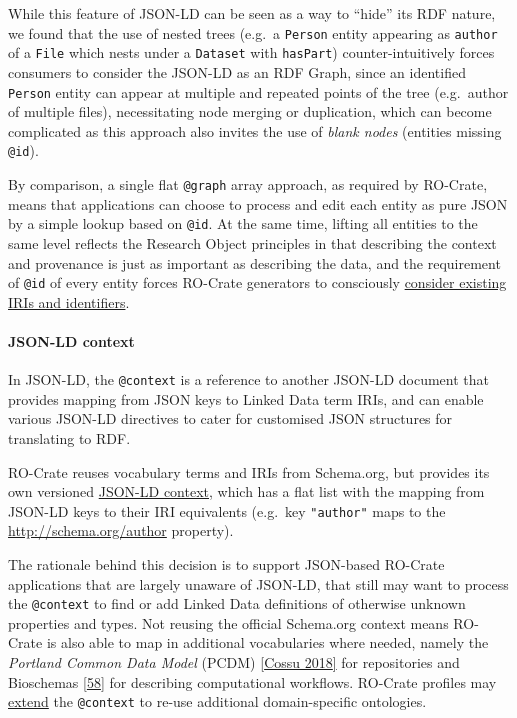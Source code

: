 {While this feature of JSON-LD can be seen as a way to ``hide'' its RDF
nature, we found that the use of nested trees (e.g.~a \texttt{Person}
entity appearing as \texttt{author} of a \texttt{File} which nests under
a \texttt{Dataset} with \texttt{hasPart}) counter-intuitively forces
consumers to consider the JSON-LD as an RDF Graph, since an identified
\texttt{Person} entity can appear at multiple and repeated points of the
tree (e.g.~author of multiple files), necessitating node merging or
duplication, which can become complicated as this approach also invites
the use of \emph{blank nodes} (entities missing \texttt{@id}).

By comparison, a single flat \texttt{@graph} array approach, as required
by RO-Crate, means that applications can choose to process and edit each
entity as pure JSON by a simple lookup based on \texttt{@id}. At the
same time, lifting all entities to the same level reflects the Research
Object principles
\cite{ch5-12}
in that describing the context and provenance is just as important as
describing the data, and the requirement of \texttt{@id} of every entity
forces RO-Crate generators to consciously
\href{https://www.researchobject.org/ro-crate/1.1/appendix/jsonld.html\#describing-entities-in-json-ld}{consider
existing IRIs and identifiers}.

\hypertarget{json-ld-context}{%
\paragraph{JSON-LD context}\label{json-ld-context}}

In JSON-LD, the \texttt{@context} is a reference to another JSON-LD
document that provides mapping from JSON keys to Linked Data term IRIs,
and can enable various JSON-LD directives to cater for customised JSON
structures for translating to RDF.

RO-Crate reuses vocabulary terms and IRIs from Schema.org, but provides
its own versioned \href{https://w3id.org/ro/crate/1.1/context}{JSON-LD
context}, which has a flat list with the mapping from JSON-LD keys to
their IRI equivalents (e.g.~key \texttt{"author"} maps to the
\url{http://schema.org/author} property).

The rationale behind this decision is to support JSON-based RO-Crate
applications that are largely unaware of JSON-LD, that still may want to
process the \texttt{@context} to find or add Linked Data definitions of
otherwise unknown properties and types. Not reusing the official
Schema.org context means RO-Crate is also able to map in additional
vocabularies where needed, namely the \emph{Portland Common Data Model}
(PCDM) \href{https://github.com/duraspace/pcdm/wiki}{{[}Cossu 2018{]}} for
repositories and Bioschemas
\href{https://iswc2017.semanticweb.org/paper-579/}{{[}58{]}} for
describing computational workflows. RO-Crate profiles may
\href{https://www.researchobject.org/ro-crate/1.1/appendix/jsonld.html\#extending-ro-crate}{extend}
the \texttt{@context} to re-use additional domain-specific ontologies.

}
